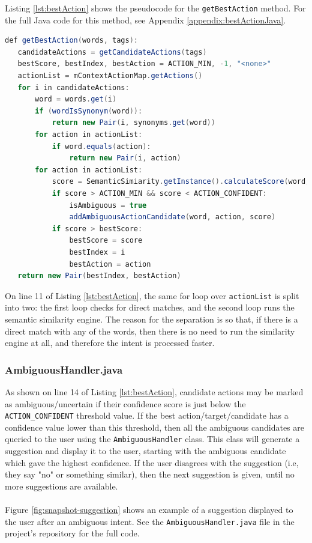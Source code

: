 \documentclass[11pt]{article}
\begin{document}
Listing \ref{lst:bestAction} shows the pseudocode for the \texttt{getBestAction} method. For the full Java code for this method, see Appendix \ref{appendix:bestActionJava}.
\\
\begin{lstlisting}[language=Java, caption=getBestAction() pseudocode, label={lst:bestAction}]
def getBestAction(words, tags):
   candidateActions = getCandidateActions(tags)
   bestScore, bestIndex, bestAction = ACTION_MIN, -1, "<none>"
   actionList = mContextActionMap.getActions()
   for i in candidateActions:
       word = words.get(i)
       if (wordIsSynonym(word)):
           return new Pair(i, synonyms.get(word))
       for action in actionList:
           if word.equals(action):
               return new Pair(i, action)
       for action in actionList:
           score = SemanticSimiarity.getInstance().calculateScore(word, action)
           if score > ACTION_MIN && score < ACTION_CONFIDENT:
               isAmbiguous = true
               addAmbiguousActionCandidate(word, action, score)
           if score > bestScore:
               bestScore = score
               bestIndex = i
               bestAction = action
   return new Pair(bestIndex, bestAction)
\end{lstlisting}

On line 11 of Listing \ref{lst:bestAction}, the same for loop over \texttt{actionList} is split into two: the first loop checks for direct matches, and the second loop runs the semantic similarity engine. The reason for the separation is so that, if there is a direct match with any of the words, then there is no need to run the similarity engine at all, and therefore the intent is processed faster.

\subsubsection{AmbiguousHandler.java}

As shown on line 14 of Listing \ref{lst:bestAction}, candidate actions may be marked as ambiguous/uncertain if their confidence score is just below the \texttt{ACTION\_CONFIDENT} threshold value. If the best action/target/candidate has a confidence value lower than this threshold, then all the ambiguous candidates are queried to the user using the \texttt{AmbiguousHandler} class. This class will generate a suggestion and display it to the user, starting with the ambiguous candidate which gave the highest confidence. If the user disagrees with the suggestion (i.e, they say "no" or something similar), then the next suggestion is given, until no more suggestions are available.
\\
\\
Figure \ref{fig:snapshot-suggestion} shows an example of a suggestion displayed to the user after an ambiguous intent. See the \texttt{AmbiguousHandler.java} file in the project's repository for the full code.
\end{document}
